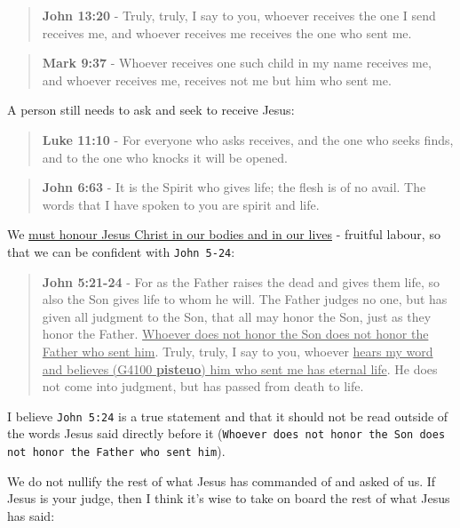 \documentclass[11pt]{article}
\begin{document}
\begin{quote}
\textbf{John 13:20} - Truly, truly, I say to you, whoever receives the one I send receives me, and whoever receives me receives the one who sent me.
\end{quote}

\begin{quote}
\textbf{Mark 9:37} - Whoever receives one such child in my name receives me, and whoever receives me, receives not me but him who sent me.
\end{quote}

A person still needs to ask and seek to receive Jesus:

\begin{quote}
\textbf{Luke 11:10} - For everyone who asks receives, and the one who seeks finds, and to the one who knocks it will be opened.
\end{quote}

\begin{quote}
\textbf{John 6:63} - It is the Spirit who gives life; the flesh is of no avail. The words that I have spoken to you are spirit and life.
\end{quote}

We \uline{must honour Jesus Christ in our bodies and in our lives} - fruitful labour, so that we can be confident with \texttt{John 5-24}:

\begin{quote}
\textbf{John 5:21-24} - For as the Father raises the dead and gives them life, so also the Son gives life to whom he will. The Father judges no one, but has given all judgment to the Son, that all may honor the Son, just as they honor the Father. \uline{Whoever does not honor the Son does not honor the Father who sent him}. Truly, truly, I say to you, whoever \uline{hears my word and believes (G4100 \textbf{pisteuo}) him who sent me has eternal life}. He does not come into judgment, but has passed from death to life.
\end{quote}

I believe \texttt{John 5:24} is a true statement and that it should not be read outside of the words Jesus said directly before it (\texttt{Whoever does not honor the Son does not honor the Father who sent him}).

We do not nullify the rest of what Jesus has commanded of and asked of us. If Jesus is your judge, then I think it's wise to take on board the rest of what Jesus has said:
\end{document}
